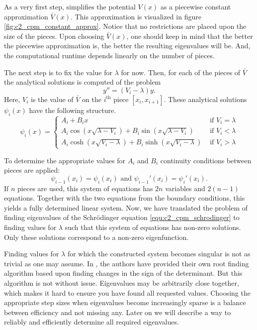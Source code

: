 As a very first step, \cite{canosa_new_1970} simplifies the potential $V(x)$ as a piecewise constant approximation $\bar{V}(x)$. This approximation is visualized in figure \ref{fig:c2_cpm_constant_approx}. Notice that no restrictions are placed upon the size of the pieces. Upon choosing $\bar{V}(x)$, one should keep in mind that the better the piecewise approximation is, the better the resulting eigenvalues will be. And, the computational runtime depends linearly on the number of pieces.

The next step is to fix the value for $\lambda$ for now. Then, for each of the pieces of $\bar{V}$ the analytical solutions is computed of the problem
$$
    y'' = (V_i - \lambda) y\text{.}
$$
Here, $V_i$ is the value of $\bar{V}$ on the $i^\text{th}$ piece $[x_i, x_{i+1}]$. These analytical solutions $\psi_i(x)$ have the following structure.
$$
    \psi_i(x) = \begin{cases}
        A_i + B_i x                                                         & \text{ if $V_i = \lambda$} \\
        A_i \cos(x\sqrt{\lambda - V_i}) + B_i \sin(x\sqrt{\lambda - V_i})   & \text{ if $V_i < \lambda$} \\
        A_i \cosh(x\sqrt{V_i - \lambda}) + B_i \sinh(x\sqrt{V_i - \lambda}) & \text{ if $V_i > \lambda$}
    \end{cases}
$$

To determine the appropriate values for $A_i$ and $B_i$ continuity conditions between pieces are applied:
$$
    \psi_{i-1}(x_i) = \psi_{i}(x_i) \text{ and } \psi_{i-1}'(x_i) = \psi_{i}'(x_i) \text{.}
$$
If $n$ pieces are used, this system of equations has $2n$ variables and $2(n-1)$ equations. Together with the two equations from the boundary conditions, this yields a fully determined linear system. Now, we have translated the problem of finding eigenvalues of the Schrödinger equation \eqref{equ:c2_cpm_schrodinger} to finding values for $\lambda$ such that this system of equations has non-zero solutions. Only these solutions correspond to a non-zero eigenfunction.

Finding values for $\lambda$ for which the constructed system becomes singular is not as trivial as one may assume. In \cite{canosa_new_1970}, the authors have provided their own root finding algorithm based upon finding changes in the sign of the determinant. But this algorithm is not without issue. Eigenvalues may be arbitrarily close together, which makes it hard to ensure you have found all requested values. Choosing the appropriate step sizes when eigenvalues become increasingly sparse is a balance between efficiency and not missing any. Later on we will describe a way to reliably and efficiently determine all required eigenvalues.

